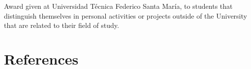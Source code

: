 \documentclass[10pt, a4paper]{moderncv}
\begin{document}
{
\begin{scriptsize}
Award given at Universidad T\'ecnica Federico Santa Mar\'ia, to students that distinguish themselves in personal activities or projects outside of the University that are related to their field of study.
\end{scriptsize}
}

\nocite{*}


\section{References}
{
}
\end{document}
